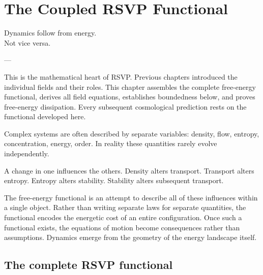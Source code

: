 
\chapter{The Coupled RSVP Functional}
\label{ch:coupled-functional}

\epigraph{%
  Dynamics follow from energy.\\
  Not vice versa.%
}{---}

\begin{WhyChapter}
  This is the mathematical heart of RSVP\@.
  Previous chapters introduced the individual fields and their
  roles.
  This chapter assembles the complete free-energy functional,
  derives all field equations, establishes boundedness below,
  and proves free-energy dissipation.
  Every subsequent cosmological prediction rests on the
  functional developed here.
\end{WhyChapter}


\begin{ChapterIntro}
Complex systems are often described by separate variables: density, flow, entropy, concentration, energy, order. In reality these quantities rarely evolve independently.

A change in one influences the others. Density alters transport. Transport alters entropy. Entropy alters stability. Stability alters subsequent transport.

The free-energy functional is an attempt to describe all of these influences within a single object. Rather than writing separate laws for separate quantities, the functional encodes the energetic cost of an entire configuration. Once such a functional exists, the equations of motion become consequences rather than assumptions. Dynamics emerge from the geometry of the energy landscape itself.
\end{ChapterIntro}

\section{The complete RSVP functional}

